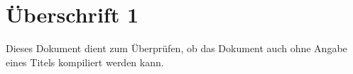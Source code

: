 \documentclass{htblagkr}
\begin{document}
    \section{Überschrift 1}

    Dieses Dokument dient zum Überprüfen, ob das Dokument auch ohne Angabe eines Titels kompiliert werden kann.
\end{document}
